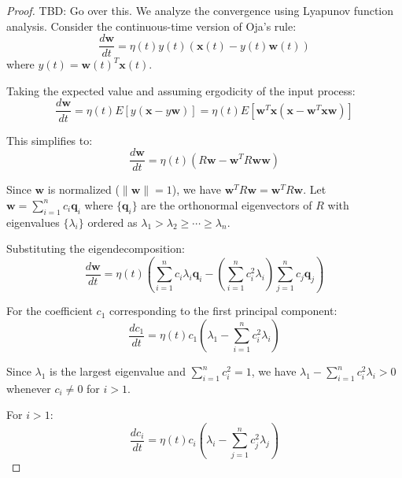   \begin{proof}
    TBD: Go over this. We analyze the convergence using Lyapunov function analysis. Consider the continuous-time version of Oja's rule:
    \begin{equation}
      \frac{d\mathbf{w}}{dt} = \eta(t) y(t) (\mathbf{x}(t) - y(t) \mathbf{w}(t))
    \end{equation}
    where $y(t) = \mathbf{w}(t)^T \mathbf{x}(t)$.
   
    Taking the expected value and assuming ergodicity of the input process:
    \begin{equation}
      \frac{d\mathbf{w}}{dt} = \eta(t) E[y(\mathbf{x} - y\mathbf{w})] = \eta(t) E[\mathbf{w}^T\mathbf{x}(\mathbf{x} - \mathbf{w}^T\mathbf{x}\mathbf{w})]
    \end{equation}
   
    This simplifies to:
    \begin{equation}
      \frac{d\mathbf{w}}{dt} = \eta(t) (R\mathbf{w} - \mathbf{w}^T R \mathbf{w} \mathbf{w})
    \end{equation}
   
    Since $\mathbf{w}$ is normalized ($\|\mathbf{w}\| = 1$), we have $\mathbf{w}^T R \mathbf{w} = \mathbf{w}^T R \mathbf{w}$. Let $\mathbf{w} = \sum_{i=1}^n c_i \mathbf{q}_i$ where $\{\mathbf{q}_i\}$ are the orthonormal eigenvectors of $R$ with eigenvalues $\{\lambda_i\}$ ordered as $\lambda_1 > \lambda_2 \geq \cdots \geq \lambda_n$.
   
    Substituting the eigendecomposition:
    \begin{equation}
      \frac{d\mathbf{w}}{dt} = \eta(t) \left(\sum_{i=1}^n c_i \lambda_i \mathbf{q}_i - \left(\sum_{i=1}^n c_i^2 \lambda_i\right) \sum_{j=1}^n c_j \mathbf{q}_j\right)
    \end{equation}
   
    For the coefficient $c_1$ corresponding to the first principal component:
    \begin{equation}
      \frac{dc_1}{dt} = \eta(t) c_1 \left(\lambda_1 - \sum_{i=1}^n c_i^2 \lambda_i\right)
    \end{equation}
   
    Since $\lambda_1$ is the largest eigenvalue and $\sum_{i=1}^n c_i^2 = 1$, we have $\lambda_1 - \sum_{i=1}^n c_i^2 \lambda_i > 0$ whenever $c_i \neq 0$ for $i > 1$.
   
    For $i > 1$:
    \begin{equation}
      \frac{dc_i}{dt} = \eta(t) c_i \left(\lambda_i - \sum_{j=1}^n c_j^2 \lambda_j\right)
    \end{equation}
   

\end{proof}
